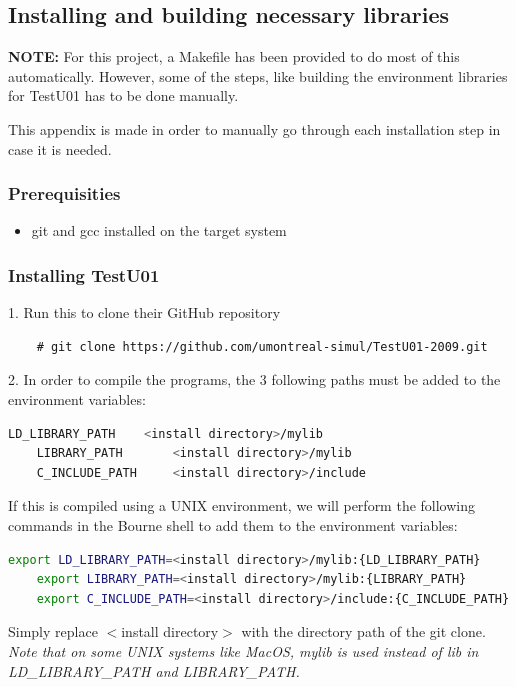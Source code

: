 \documentclass[]{final_report}
\begin{document}
\subsection*{Installing and building necessary libraries}

\textbf{NOTE:} For this project, a Makefile has been provided to do most of this automatically. However, some of the steps, like building the environment libraries for TestU01 has to be done manually.

This appendix is made in order to manually go through each installation step in case it is needed.

\subsubsection*{Prerequisities}
\begin{itemize}
\item{git and gcc installed on the target system}
\end{itemize}

\subsubsection*{Installing TestU01}
1. Run this to clone their GitHub repository
\begin{lstlisting}
    # git clone https://github.com/umontreal-simul/TestU01-2009.git
\end{lstlisting}
2. In order to compile the programs, the 3 following paths must be added to the environment variables:
\begin{lstlisting}[language=bash]
    LD_LIBRARY_PATH    <install directory>/mylib
    LIBRARY_PATH       <install directory>/mylib
    C_INCLUDE_PATH     <install directory>/include
\end{lstlisting}

If this is compiled using a UNIX environment, we will perform the following commands in the Bourne shell to add them to the environment variables:

\begin{lstlisting}[language=bash]
    export LD_LIBRARY_PATH=<install directory>/mylib:{LD_LIBRARY_PATH}
    export LIBRARY_PATH=<install directory>/mylib:{LIBRARY_PATH}
    export C_INCLUDE_PATH=<install directory>/include:{C_INCLUDE_PATH}
\end{lstlisting}

Simply replace $<$install directory$>$ with the directory path of the git clone. \textit{Note that on some UNIX systems like MacOS, mylib is used instead of lib in LD\_LIBRARY\_PATH and LIBRARY\_PATH.}
\end{document}
